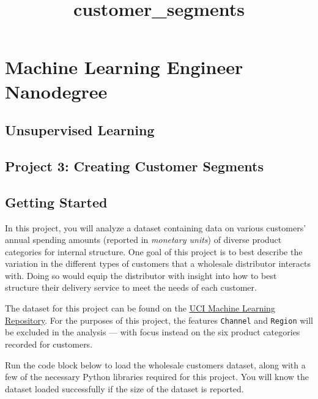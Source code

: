 \documentclass{article}
\title{customer\_segments}
\begin{document}
    
    
    \maketitle
    
    

    
    \section{Machine Learning Engineer
Nanodegree}\label{machine-learning-engineer-nanodegree}

\subsection{Unsupervised Learning}\label{unsupervised-learning}

\subsection{Project 3: Creating Customer
Segments}\label{project-3-creating-customer-segments}

    \subsection{Getting Started}\label{getting-started}

In this project, you will analyze a dataset containing data on various
customers' annual spending amounts (reported in \emph{monetary units})
of diverse product categories for internal structure. One goal of this
project is to best describe the variation in the different types of
customers that a wholesale distributor interacts with. Doing so would
equip the distributor with insight into how to best structure their
delivery service to meet the needs of each customer.

The dataset for this project can be found on the
\href{https://archive.ics.uci.edu/ml/datasets/Wholesale+customers}{UCI
Machine Learning Repository}. For the purposes of this project, the
features \texttt{\textquotesingle{}Channel\textquotesingle{}} and
\texttt{\textquotesingle{}Region\textquotesingle{}} will be excluded in
the analysis --- with focus instead on the six product categories
recorded for customers.

Run the code block below to load the wholesale customers dataset, along
with a few of the necessary Python libraries required for this project.
You will know the dataset loaded successfully if the size of the dataset
is reported.
\end{document}
